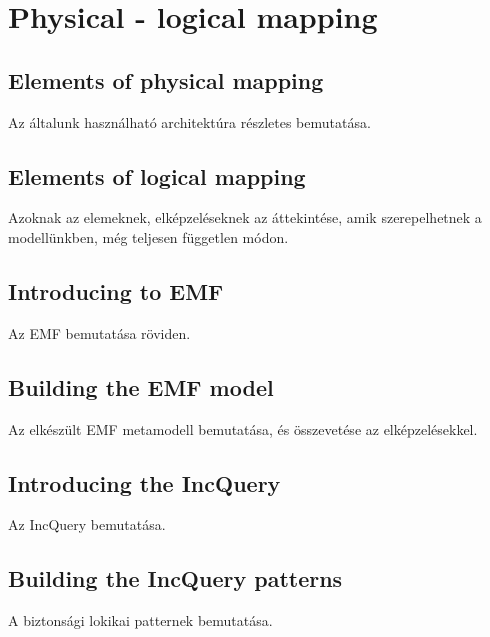 \section{Physical - logical mapping}
	\subsection{Elements of physical mapping}
		Az általunk használható architektúra részletes bemutatása.
	\subsection{Elements of logical mapping}
		Azoknak az elemeknek, elképzeléseknek az áttekintése, amik szerepelhetnek a modellünkben, még teljesen független módon.
	\subsection{Introducing to EMF}
		Az EMF bemutatása röviden.
	\subsection{Building the EMF model}
		Az elkészült EMF metamodell bemutatása, és összevetése az elképzelésekkel.
	\subsection{Introducing the IncQuery}
		Az IncQuery bemutatása.
	\subsection{Building the IncQuery patterns}
		A biztonsági lokikai patternek bemutatása.